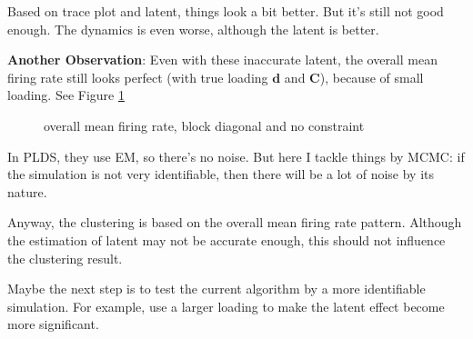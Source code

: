 \documentclass[]{article}
\begin{document}
Based on trace plot and latent, things look a bit better. But it's still not good enough. The dynamics is even worse, although the latent is better.

\textbf{Another Observation}:
Even with these inaccurate latent, the overall mean firing rate still looks perfect (with true loading \(\mathbf{d}\) and \(\mathbf{C}\)), because of small loading. See Figure \ref{mfr, blk and full}

\begin{figure}[h!]
	\caption{overall mean firing rate, block diagonal and no constraint}
	\label{mfr, blk and full}
\end{figure}

In PLDS, they use EM, so there's no noise. But here I tackle things by MCMC: if the simulation is not very identifiable, then there will be a lot of noise by its nature.

Anyway, the clustering is based on the overall mean firing rate pattern. Although the estimation of latent may not be accurate enough, this should not influence the clustering result.

Maybe the next step is to test the current algorithm by a more identifiable simulation. For example, use a larger loading to make the latent effect become more significant.
\end{document}
